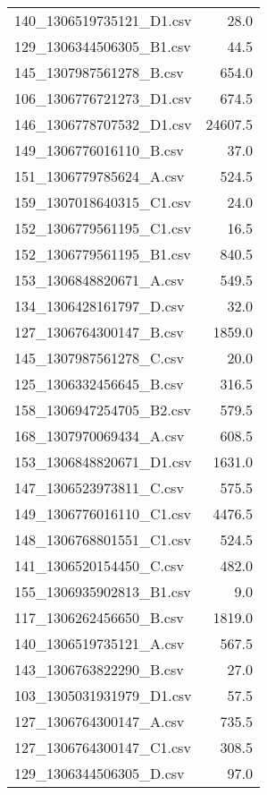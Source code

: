 \documentclass[conference]{IEEEtran}
\begin{document}
\begin{table}
\begin{tabular}{l | r }
	140\_{}1306519735121\_{}D1.csv & 28.0 \\
	129\_{}1306344506305\_{}B1.csv & 44.5 \\
	145\_{}1307987561278\_{}B.csv & 654.0 \\
	106\_{}1306776721273\_{}D1.csv & 674.5 \\
	146\_{}1306778707532\_{}D1.csv & 24607.5 \\
	149\_{}1306776016110\_{}B.csv & 37.0 \\
	151\_{}1306779785624\_{}A.csv & 524.5 \\
	159\_{}1307018640315\_{}C1.csv & 24.0 \\
	152\_{}1306779561195\_{}C1.csv & 16.5 \\
	152\_{}1306779561195\_{}B1.csv & 840.5 \\
	153\_{}1306848820671\_{}A.csv & 549.5 \\
	134\_{}1306428161797\_{}D.csv & 32.0 \\
	127\_{}1306764300147\_{}B.csv & 1859.0 \\
	145\_{}1307987561278\_{}C.csv & 20.0 \\
	125\_{}1306332456645\_{}B.csv & 316.5 \\
	158\_{}1306947254705\_{}B2.csv & 579.5 \\
	168\_{}1307970069434\_{}A.csv & 608.5 \\
	153\_{}1306848820671\_{}D1.csv & 1631.0 \\
	147\_{}1306523973811\_{}C.csv & 575.5 \\
	149\_{}1306776016110\_{}C1.csv & 4476.5 \\
	148\_{}1306768801551\_{}C1.csv & 524.5 \\
	141\_{}1306520154450\_{}C.csv & 482.0 \\
	155\_{}1306935902813\_{}B1.csv & 9.0 \\
	117\_{}1306262456650\_{}B.csv & 1819.0 \\
	140\_{}1306519735121\_{}A.csv & 567.5 \\
	143\_{}1306763822290\_{}B.csv & 27.0 \\
	103\_{}1305031931979\_{}D1.csv & 57.5 \\
	127\_{}1306764300147\_{}A.csv & 735.5 \\
	127\_{}1306764300147\_{}C1.csv & 308.5 \\
	129\_{}1306344506305\_{}D.csv & 97.0 \\

\end{tabular}
\end{table}
\end{document}
